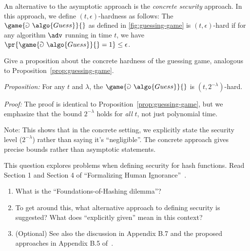 \begin{exercise}[Optional]\label{ex:concrete-security}
  An alternative to the asymptotic approach is the \emph{concrete security} approach.
  In this approach, we define $(t,\epsilon)$-hardness as follows:
  The $\game{\Game~\algo{Guess}}{}$ as defined in \autoref{fig:guessing-game} is $(t,\epsilon)$-hard if for any algorithm $\adv$ running in time $t$, we have $\pr{\game{\Game~\algo{Guess}}{} = 1} \le \epsilon$.
  
  Give a proposition about the concrete hardness of the guessing game, analogous to Proposition~\ref{prop:guessing-game}.
\end{exercise}

\ifsolutions
\begin{mysolution}
  \emph{Proposition:} For any $t$ and $\lambda$, the $\game{\Game~\algo{Guess}}{}$ is $(t, 2^{-\lambda})$-hard.
  
  \emph{Proof:} The proof is identical to Proposition~\ref{prop:guessing-game}, but we emphasize that the bound $2^{-\lambda}$ holds for \emph{all} $t$, not just polynomial time.
  
  Note: This shows that in the concrete setting, we explicitly state the security level ($2^{-\lambda}$) rather than saying it's ``negligible''.
  The concrete approach gives precise bounds rather than asymptotic statements.
\end{mysolution}
\fi

\begin{exercise}[Optional]\label{ex:foundations-hashing}
  This question explores problems when defining security for hash functions.
  Read Section 1 and Section 4 of ``Formalizing Human Ignorance''~\cite{VIETCRYPT:Rogaway06}.
  \begin{enumerate}
    \item What is the ``Foundations-of-Hashing dilemma''?
    \item To get around this, what alternative approach to defining security is suggested?
    What does ``explicitly given'' mean in this context?
    \item (Optional) See also the discussion in Appendix B.7 and the proposed approaches in Appendix B.5 of~\cite{AC:BerLan13}.
  \end{enumerate}
\end{exercise}

